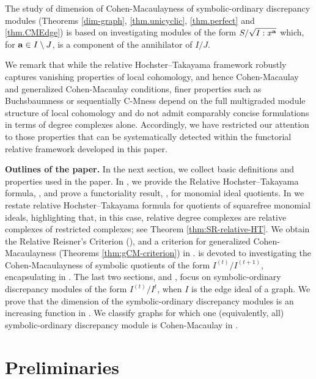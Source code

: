 \documentclass[12pt]{amsart}
\numberwithin{equation}{section}
\theoremstyle{definition}
\theoremstyle{definition}
\def\a{{\bold a}}
\begin{document}
	\medskip
	
	The study of dimension of Cohen-Macaulayness of symbolic-ordinary discrepancy modules (Theorems \ref{dim-graph}, \ref{thm.unicyclic}, \ref{thm.perfect} and \ref{thm.CMEdge}) is based on investigating modules of the form $S/\sqrt{I:x^\a}$ which, for $\a \in I \setminus J$, is a component of the annihilator of $I/J$.
	
	We remark that while the relative Hochster--Takayama framework robustly captures vanishing properties of local cohomology, and hence Cohen-Macaulay and generalized Cohen-Macaulay conditions, finer properties such as Buchsbaumness or sequentially C-Mness depend on the full multigraded module structure of local cohomology and do not admit comparably concise formulations in terms of degree complexes alone. Accordingly, we have restricted our attention to those properties that can be systematically detected within the functorial relative framework developed in this paper.
	
	\medskip
	
\noindent\textbf{Outlines of the paper.}	In the next section, we collect basic definitions and properties used in the paper. In , we provide the Relative Hochster--Takayama formula, , and prove a functoriality result, , for monomial ideal quotients. In  we restate relative Hochster--Takayama formula for quotients of squarefree monomial ideals, highlighting that, in this case, relative degree complexes are relative complexes of restricted complexes; see Theorem \ref{thm:SR-relative-HT}. We obtain the Relative Reisner's Criterion (), and a criterion for generalized Cohen-Macaulayness (Theorems \ref{thm:gCM-criterion}) in .  is devoted to investigating the Cohen-Macaulayness of symbolic quotients of the form $I^{(t)}/I^{(t+1)}$, encapsulating in . The last two sections,  and , focus on symbolic-ordinary discrepancy modules of the form $I^{(t)}/I^t$, when $I$ is the edge ideal of a graph. We prove that the dimension of the symbolic-ordinary discrepancy modules is an increasing function in . We classify graphs for which one (equivalently, all) symbolic-ordinary discrepancy module is Cohen-Macaulay in .
	
	
	\section{Preliminaries} \label{sec.prel}
	
\end{document}
